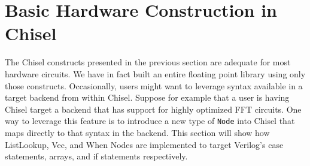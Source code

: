 \section{Basic Hardware Construction in Chisel}
The Chisel constructs presented in the previous section are adequate
for most hardware circuits. We have in fact built an entire floating
point library using only those constructs. Occasionally, users might
want to leverage syntax available in a target backend from within
Chisel. Suppose for example that a user is having Chisel target a
backend that has support for highly optimized FFT circuits. One way to
leverage this feature is to introduce a new type of {\tt Node} into
Chisel that maps directly to that syntax in the backend. This section
will show how ListLookup, Vec, and When Nodes are implemented to
target Verilog's case statements, arrays, and if statements
respectively.

